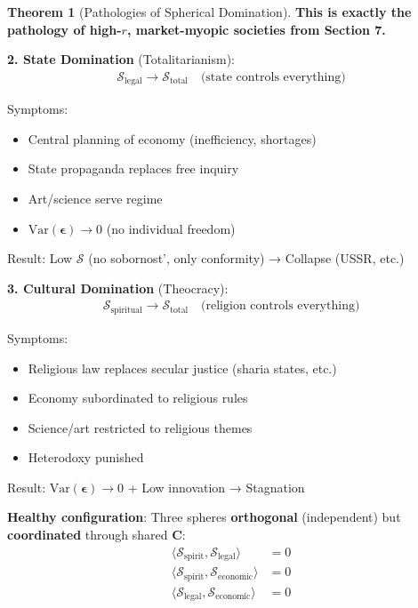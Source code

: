 \documentclass[11pt,a4paper]{article}
\theoremstyle{definition}
\newtheorem{theorem}{Theorem}[section]
\theoremstyle{remark}
\begin{document}
\begin{small}
\begin{enumerate}
\begin{theorem}[Pathologies of Spherical Domination]
\textbf{This is exactly the pathology of high-\(r\), market-myopic societies from Section 7.}

\textbf{2. State Domination} (Totalitarianism):
\begin{align}
\mathcal{S}_{\text{legal}} \to \mathcal{S}_{\text{total}} \quad \text{(state controls everything)}
\end{align}

Symptoms:
\begin{itemize}
    \item Central planning of economy (inefficiency, shortages)
    \item State propaganda replaces free inquiry
    \item Art/science serve regime
    \item \(\text{Var}(\boldsymbol{\epsilon}) \to 0\) (no individual freedom)
\end{itemize}

Result: Low \(\mathcal{S}\) (no sobornost', only conformity) → Collapse (USSR, etc.)

\textbf{3. Cultural Domination} (Theocracy):
\begin{align}
\mathcal{S}_{\text{spiritual}} \to \mathcal{S}_{\text{total}} \quad \text{(religion controls everything)}
\end{align}

Symptoms:
\begin{itemize}
    \item Religious law replaces secular justice (sharia states, etc.)
    \item Economy subordinated to religious rules
    \item Science/art restricted to religious themes
    \item Heterodoxy punished
\end{itemize}

Result: \(\text{Var}(\boldsymbol{\epsilon}) \to 0\) + Low innovation → Stagnation

\textbf{Healthy configuration}: Three spheres \textbf{orthogonal} (independent) but \textbf{coordinated} through shared \(\mathbf{C}\):
\begin{align}
\langle \mathcal{S}_{\text{spirit}}, \mathcal{S}_{\text{legal}} \rangle &= 0 \\
\langle \mathcal{S}_{\text{spirit}}, \mathcal{S}_{\text{economic}} \rangle &= 0 \\
\langle \mathcal{S}_{\text{legal}}, \mathcal{S}_{\text{economic}} \rangle &= 0
\end{align}


\end{theorem}
\end{enumerate}
\end{small}
\end{document}
